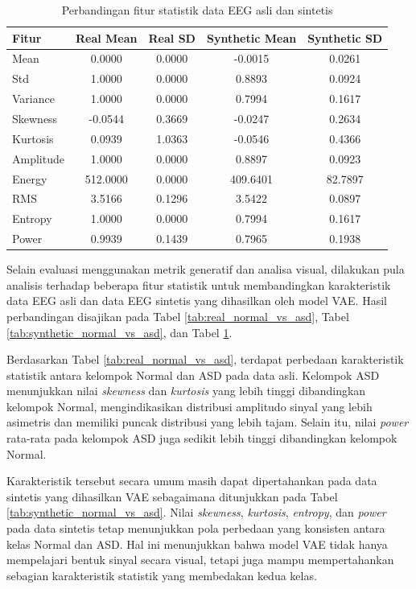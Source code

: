 \begin{table}[H]
\centering
\footnotesize
\caption{Perbandingan fitur statistik data EEG asli dan sintetis}
\label{tab:real_vs_synthetic}
\begin{tabular}{|l|c|c|c|c|}
\hline
\textbf{Fitur} & \textbf{Real Mean} & \textbf{Real SD} & \textbf{Synthetic Mean} & \textbf{Synthetic SD} \\
\hline
Mean      & 0.0000 & 0.0000 & -0.0015 & 0.0261 \\
Std       & 1.0000 & 0.0000 & 0.8893 & 0.0924 \\
Variance  & 1.0000 & 0.0000 & 0.7994 & 0.1617 \\
Skewness  & -0.0544 & 0.3669 & -0.0247 & 0.2634 \\
Kurtosis  & 0.0939 & 1.0363 & -0.0546 & 0.4366 \\
Amplitude & 1.0000 & 0.0000 & 0.8897 & 0.0923 \\
Energy    & 512.0000 & 0.0000 & 409.6401 & 82.7897 \\
RMS       & 3.5166 & 0.1296 & 3.5422 & 0.0897 \\
Entropy   & 1.0000 & 0.0000 & 0.7994 & 0.1617 \\
Power     & 0.9939 & 0.1439 & 0.7965 & 0.1938 \\
\hline
\end{tabular}
\end{table}

Selain evaluasi menggunakan metrik generatif dan analisa visual, dilakukan pula analisis terhadap beberapa fitur statistik untuk membandingkan karakteristik data EEG asli dan data EEG sintetis yang dihasilkan oleh model VAE. Hasil perbandingan disajikan pada Tabel \ref{tab:real_normal_vs_asd}, Tabel \ref{tab:synthetic_normal_vs_asd}, dan Tabel \ref{tab:real_vs_synthetic}.

Berdasarkan Tabel \ref{tab:real_normal_vs_asd}, terdapat perbedaan karakteristik statistik antara kelompok Normal dan ASD pada data asli. Kelompok ASD menunjukkan nilai \textit{skewness} dan \textit{kurtosis} yang lebih tinggi dibandingkan kelompok Normal, mengindikasikan distribusi amplitudo sinyal yang lebih asimetris dan memiliki puncak distribusi yang lebih tajam. Selain itu, nilai \textit{power} rata-rata pada kelompok ASD juga sedikit lebih tinggi dibandingkan kelompok Normal.

Karakteristik tersebut secara umum masih dapat dipertahankan pada data sintetis yang dihasilkan VAE sebagaimana ditunjukkan pada Tabel \ref{tab:synthetic_normal_vs_asd}. Nilai \textit{skewness}, \textit{kurtosis}, \textit{entropy}, dan \textit{power} pada data sintetis tetap menunjukkan pola perbedaan yang konsisten antara kelas Normal dan ASD. Hal ini menunjukkan bahwa model VAE tidak hanya mempelajari bentuk sinyal secara visual, tetapi juga mampu mempertahankan sebagian karakteristik statistik yang membedakan kedua kelas.

